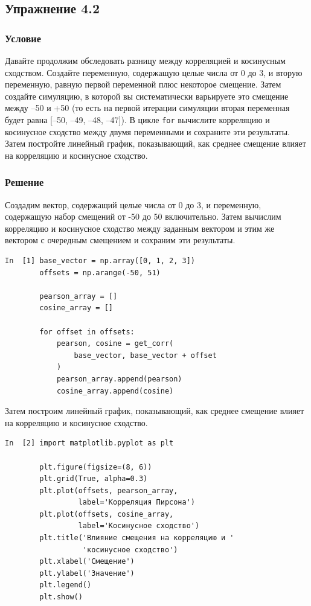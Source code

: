 \documentclass{article}
\begin{document}
\subsection*{Упражнение 4.2}

\subsubsection*{Условие}

Давайте продолжим обследовать разницу между корреляцией и косинусным сходством. Создайте переменную, содержащую целые числа от 0 до 3, и вторую переменную, равную первой переменной плюс некоторое смещение. Затем создайте симуляцию, в которой вы систематически варьируете это смещение между –50 и +50 (то есть на первой итерации симуляции вторая переменная будет равна [–50, –49, –48, –47]). В цикле \texttt{for} вычислите корреляцию и косинусное сходство между двумя переменными и сохраните эти результаты. Затем постройте линейный график, показывающий, как среднее смещение влияет на корреляцию и косинусное сходство.

\subsubsection*{Решение}

Создадим вектор, содержащий целые числа от 0 до 3, и переменную, содержащую набор смещений от -50 до 50 включительно. Затем вычислим корреляцию и косинусное сходство между заданным вектором и этим же вектором с очередным смещением и сохраним эти результаты.

\begin{verbatim}
In  [1] base_vector = np.array([0, 1, 2, 3])
        offsets = np.arange(-50, 51)

        pearson_array = []
        cosine_array = []

        for offset in offsets:
            pearson, cosine = get_corr(
                base_vector, base_vector + offset
            )
            pearson_array.append(pearson)
            cosine_array.append(cosine)
\end{verbatim}

Затем построим линейный график, показывающий, как среднее смещение влияет на корреляцию и косинусное сходство.

\begin{verbatim}
In  [2] import matplotlib.pyplot as plt

        plt.figure(figsize=(8, 6))
        plt.grid(True, alpha=0.3)
        plt.plot(offsets, pearson_array,
                 label='Корреляция Пирсона')
        plt.plot(offsets, cosine_array,
                 label='Косинусное сходство')
        plt.title('Влияние смещения на корреляцию и '
                  'косинусное сходство')
        plt.xlabel('Смещение')
        plt.ylabel('Значение')
        plt.legend()
        plt.show()
\end{verbatim}
\end{document}
